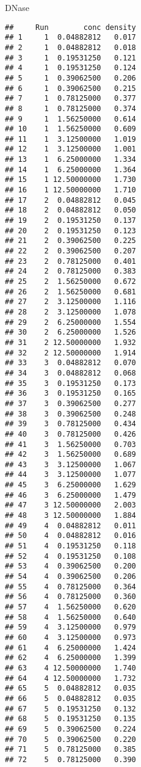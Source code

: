 \documentclass[
]{article}
\newenvironment{Shaded}{\begin{snugshade}}{\end{snugshade}}
\newcommand{\NormalTok}[1]{#1}
\begin{document}
\begin{Shaded}
\begin{Highlighting}[]
\NormalTok{DNase}
\end{Highlighting}
\end{Shaded}

\begin{verbatim}
##     Run        conc density
## 1     1  0.04882812   0.017
## 2     1  0.04882812   0.018
## 3     1  0.19531250   0.121
## 4     1  0.19531250   0.124
## 5     1  0.39062500   0.206
## 6     1  0.39062500   0.215
## 7     1  0.78125000   0.377
## 8     1  0.78125000   0.374
## 9     1  1.56250000   0.614
## 10    1  1.56250000   0.609
## 11    1  3.12500000   1.019
## 12    1  3.12500000   1.001
## 13    1  6.25000000   1.334
## 14    1  6.25000000   1.364
## 15    1 12.50000000   1.730
## 16    1 12.50000000   1.710
## 17    2  0.04882812   0.045
## 18    2  0.04882812   0.050
## 19    2  0.19531250   0.137
## 20    2  0.19531250   0.123
## 21    2  0.39062500   0.225
## 22    2  0.39062500   0.207
## 23    2  0.78125000   0.401
## 24    2  0.78125000   0.383
## 25    2  1.56250000   0.672
## 26    2  1.56250000   0.681
## 27    2  3.12500000   1.116
## 28    2  3.12500000   1.078
## 29    2  6.25000000   1.554
## 30    2  6.25000000   1.526
## 31    2 12.50000000   1.932
## 32    2 12.50000000   1.914
## 33    3  0.04882812   0.070
## 34    3  0.04882812   0.068
## 35    3  0.19531250   0.173
## 36    3  0.19531250   0.165
## 37    3  0.39062500   0.277
## 38    3  0.39062500   0.248
## 39    3  0.78125000   0.434
## 40    3  0.78125000   0.426
## 41    3  1.56250000   0.703
## 42    3  1.56250000   0.689
## 43    3  3.12500000   1.067
## 44    3  3.12500000   1.077
## 45    3  6.25000000   1.629
## 46    3  6.25000000   1.479
## 47    3 12.50000000   2.003
## 48    3 12.50000000   1.884
## 49    4  0.04882812   0.011
## 50    4  0.04882812   0.016
## 51    4  0.19531250   0.118
## 52    4  0.19531250   0.108
## 53    4  0.39062500   0.200
## 54    4  0.39062500   0.206
## 55    4  0.78125000   0.364
## 56    4  0.78125000   0.360
## 57    4  1.56250000   0.620
## 58    4  1.56250000   0.640
## 59    4  3.12500000   0.979
## 60    4  3.12500000   0.973
## 61    4  6.25000000   1.424
## 62    4  6.25000000   1.399
## 63    4 12.50000000   1.740
## 64    4 12.50000000   1.732
## 65    5  0.04882812   0.035
## 66    5  0.04882812   0.035
## 67    5  0.19531250   0.132
## 68    5  0.19531250   0.135
## 69    5  0.39062500   0.224
## 70    5  0.39062500   0.220
## 71    5  0.78125000   0.385
## 72    5  0.78125000   0.390

\end{verbatim}
\end{document}
